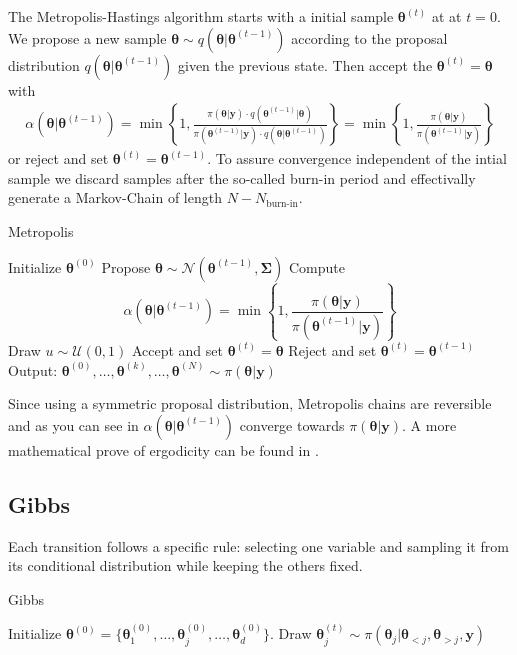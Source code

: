 The Metropolis-Hastings algorithm starts with a initial sample $\bm{\theta}^{(t)}$ at  at $t=0$.
We propose a new sample $\bm{\theta}\sim q(\bm{\theta} | \bm{\theta}^{(t-1)})$ according to the proposal distribution $q(\bm{\theta} | \bm{\theta}^{(t-1)})$ given the previous state.
Then accept the $ \bm{\theta}^{(t)} = \bm{\theta}$ with
\begin{align}
\alpha(\bm{\theta} | \bm{\theta}^{(t-1)}) = \min \left\{ 1, \frac{\pi(\bm{\theta} | \bm{y}) \cdot 	q(\bm{\theta}^{(t-1)} | \bm{\theta})}{\pi(\bm{\theta}^{(t-1)}|  \bm{y}) \cdot q(\bm{\theta} | \bm{\theta}^{(t-1)})} \right\}= \min \left\{ 1, \frac{\pi(\bm{\theta}  | \bm{y}) }{\pi(\bm{\theta}^{(t-1)}| \bm{y})} \right\}
\end{align}
or reject and set $\bm{\theta}^{(t)} = \bm{\theta}^{(t-1)}$.
To assure convergence independent of the intial sample we discard samples after the so-called burn-in period and effectivally generate a Markov-Chain of length $N - N_{\text{burn-in}}$.

\begin{algorithm}
	\caption{Metropolis}
	\begin{algorithmic}[1]
		\STATE Initialize \( \bm{\theta}^{(0)} \)
		\STATE Propose \( \bm{\theta} \sim \mathcal{N}( \bm{\theta}^{(t-1)} , \bm{\Sigma} ) \)
		\STATE Compute
			\[ \alpha(\bm{\theta} | \bm{\theta}^{(t-1)}) = \min \left\{ 1, \frac{\pi(\bm{\theta}  | \bm{y}) }{\pi(\bm{\theta}^{(t-1)}| \bm{y}) } \right\} \]
		\STATE Draw $u \sim \mathcal{U}(0,1)$
		\STATE Accept and set \( \bm{\theta}^{(t)} = \bm{\theta} \)
		\ELSE  
		\STATE Reject and set \(\bm{\theta}^{(t)} = \bm{\theta}^{(t-1)} \)
		\ENDIF
		\ENDFOR
		\STATE Output: $ \bm{\theta}^{(0)}, \dots,  \bm{\theta}^{(k)} , \dots,   \bm{\theta}^{(N)} \sim \pi(\bm{\theta}| \bm{y}) $
	\end{algorithmic}
\end{algorithm}


Since using a symmetric proposal distribution, Metropolis chains are reversible and as you can see in $\alpha(\bm{\theta} | \bm{\theta}^{(t-1)})$ converge towards $\pi(\bm{\theta}| \bm{y})$.
A more mathematical prove of ergodicity can be found in \cite{}.

\subsection{Gibbs}
Each transition follows a specific rule: selecting one variable and sampling it from its conditional distribution while keeping the others fixed.
\begin{algorithm}
	\caption{Gibbs}
	\begin{algorithmic}[1]
		\STATE Initialize \( \bm{\theta}^{(0)} = \{\bm{\theta}^{(0)}_{1}, \dots, \bm{\theta}^{(0)}_{j},\dots,\bm{\theta}^{(0)}_{d} \} \).
		\STATE Draw \(\bm{\theta}_j^{(t)} \sim  \pi(\bm{\theta}_j | \bm{\theta}_{<j}, \bm{\theta}_{>j} , \bm{y} )\) 

		\ENDFOR
		\ENDFOR
	\end{algorithmic}
\end{algorithm}


